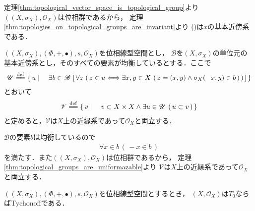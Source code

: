 	\begin{sketch}
		定理\ref{thm:topological_vector_space_is_topological_group}より
		$\left(\left(X,\sigma_X\right),\mathscr{O}_X\right)$は位相群であるから，
		定理\ref{thm:topologies_on_topological_groups_are_invariant}より
		()は$x$の基本近傍系である．
		\QED
	\end{sketch}
	
	\begin{screen}
		\begin{thm}[位相線型空間は一様化可能である]\label{thm:topological_vector_spaces_are_uniformazable}
			$\left(\left(X,\sigma_X\right),(\Phi,+,\bullet),s,\mathscr{O}_X\right)$を位相線型空間とし，
			$\mathscr{B}$を$\left(X,\sigma_X\right)$の単位元の基本近傍系とし，そのすべての要素が均衡しているとする．ここで
			\begin{align}
				\mathscr{U} \defeq \Set{u}{\exists b \in \mathscr{B}\,
				\left[\, \forall z\, \left(\, z \in u \Longleftrightarrow
				\exists x,y \in X\, \left(\, z = (x,y) \wedge \sigma_X(-x,y) \in b\, \right)\, \right)\, \right]}
			\end{align}
			とおいて
			\begin{align}
				\mathscr{V} \defeq \Set{v}{v \subset X \times X \wedge \exists u \in \mathscr{U}\, \left(\, u \subset v\, \right)}
			\end{align}
			と定めると，$\mathscr{V}$は$X$上の近縁系であって$\mathscr{O}_X$と両立する．
		\end{thm}
	\end{screen}
	
	\begin{sketch}
		$\mathscr{B}$の要素$b$は均衡しているので
		\begin{align}
			\forall x \in b\, (\, -x \in b\, )
		\end{align}
		を満たす．また$\left(\left(X,\sigma_X\right),\mathscr{O}_X\right)$は位相群であるから，
		定理\ref{thm:topological_groups_are_uniformazable}より
		$\mathscr{V}$は$X$上の近縁系であって$\mathscr{O}_X$と両立する．
		\QED
	\end{sketch}
	
	\begin{screen}
		\begin{thm}
			$\left(\left(X,\sigma_X\right),(\Phi,+,\bullet),s,\mathscr{O}_X\right)$を位相線型空間とするとき，
			$\left(X,\mathscr{O}_X\right)$は$T_0$ならばTychonoffである．
		\end{thm}
	\end{screen}
	
